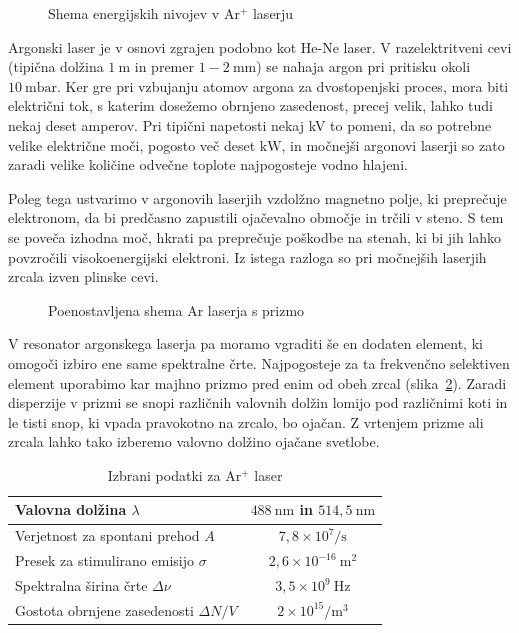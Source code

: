 \begin{figure}[h]
\centering
\def\svgwidth{80truemm} 

\caption{Shema energijskih nivojev v Ar$^+$ laserju}
\label{fig:ArE}
\end{figure}

Argonski laser je v osnovi zgrajen podobno kot He-Ne laser. V razelektritveni cevi
(tipična dolžina $1~\si{\metre}$ in premer $1-2~\si{\milli\metre}$)
se nahaja argon pri pritisku okoli $10~\si{\milli\bar}$. Ker gre pri 
vzbujanju atomov argona za dvostopenjski proces, mora biti električni tok, 
s katerim dosežemo obrnjeno zasedenost, precej velik, lahko tudi nekaj deset amperov. 
Pri tipični napetosti nekaj kV to pomeni, da so potrebne velike električne moči, 
pogosto več deset $\si{\kilo\watt}$, in močnejši argonovi laserji so zato zaradi 
velike količine odvečne toplote najpogosteje vodno hlajeni.

Poleg tega ustvarimo v argonovih laserjih vzdolžno magnetno polje, ki preprečuje 
elektronom, da bi predčasno zapustili ojačevalno območje in trčili v steno. S
tem se poveča izhodna moč, hkrati pa preprečuje poškodbe na stenah, ki bi jih 
lahko povzročili visokoenergijski elektroni. Iz istega razloga so pri močnejših
laserjih zrcala izven plinske cevi. 

\begin{figure}[h]
\centering
\def\svgwidth{80truemm} 

\caption{Poenostavljena shema Ar laserja s prizmo}
\label{fig:ArS}
\end{figure}

V resonator argonskega laserja pa moramo vgraditi še en dodaten element, ki omogoči
izbiro ene same spektralne črte. Najpogosteje za ta frekvenčno selektiven element
uporabimo kar majhno prizmo pred enim od obeh zrcal (slika~\ref{fig:ArS}). Zaradi disperzije
v prizmi se snopi različnih valovnih dolžin lomijo pod različnimi koti in le tisti 
snop, ki vpada pravokotno na zrcalo, bo ojačan. Z vrtenjem prizme ali zrcala lahko 
tako izberemo valovno dolžino ojačane svetlobe.

\begin{table}
\begin{center}
\begin{tabular}{|l|c|}\hline
Valovna dolžina $\lambda$ & $488~\si{\nano\metre}$ in $514,5~\si{\nano\metre}$\\ \hline
Verjetnost za spontani prehod $A$ & $7,8 \times 10^7/\si{\second}$  \\ \hline
Presek za stimulirano emisijo $\sigma$ & $2,6 \times 10^{-16}~\si{\metre}^2$  \\ \hline
Spektralna širina črte $\Delta \nu$ & $3,5 \times 10^{9}~\si{\hertz}$  \\ \hline
Gostota obrnjene zasedenosti $\Delta N/V$ & $2 \times 10^{15}/\si{\metre}^3$ \\ \hline
\end{tabular}
\caption{Izbrani podatki za Ar$^+$ laser}
\label{tab:Ar}
\end{center}
\end{table}

